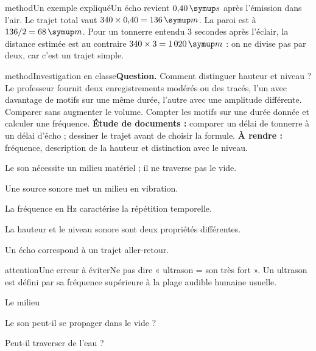 \begin{pcEncadre}{method}{Un exemple expliqué}Un écho revient $0{,}40\unite s$ après l’émission dans l’air. Le trajet total vaut $340\times0{,}40=136\unite m$. La paroi est à $136/2=68\unite m$. Pour un tonnerre entendu 3 secondes après l’éclair, la distance estimée est au contraire $340\times3=1\,020\unite m$ : on ne divise pas par deux, car c’est un trajet simple.\end{pcEncadre}
\label{activite-17}
\begin{pcEncadre}{method}{Investigation en classe}\textbf{Question.} Comment distinguer hauteur et niveau ? Le professeur fournit deux enregistrements modérés ou des tracés, l’un avec davantage de motifs sur une même durée, l’autre avec une amplitude différente. Comparer sans augmenter le volume. Compter les motifs sur une durée donnée et calculer une fréquence. \textbf{Étude de documents :} comparer un délai de tonnerre à un délai d’écho ; dessiner le trajet avant de choisir la formule. \textbf{À rendre :} fréquence, description de la hauteur et distinction avec le niveau.\end{pcEncadre}
\begin{questions}
\item Le son nécessite un milieu matériel ; il ne traverse pas le vide.
\item Une source sonore met un milieu en vibration.
\item La fréquence en Hz caractérise la répétition temporelle.
\item La hauteur et le niveau sonore sont deux propriétés différentes.
\item Un écho correspond à un trajet aller-retour.
\end{questions}
\begin{pcEncadre}{attention}{Une erreur à éviter}Ne pas dire « ultrason = son très fort ». Un ultrason est défini par sa fréquence supérieure à la plage audible humaine usuelle.\end{pcEncadre}
\pcGrille
\clearpage{}
\par\noindent\begin{minipage}{\linewidth}
\begin{exercice}[1]{Le milieu}
\begin{questions}
\item Le son peut-il se propager dans le vide ?
\item Peut-il traverser de l’eau ?
\end{questions}
\end{exercice}
\end{minipage}
